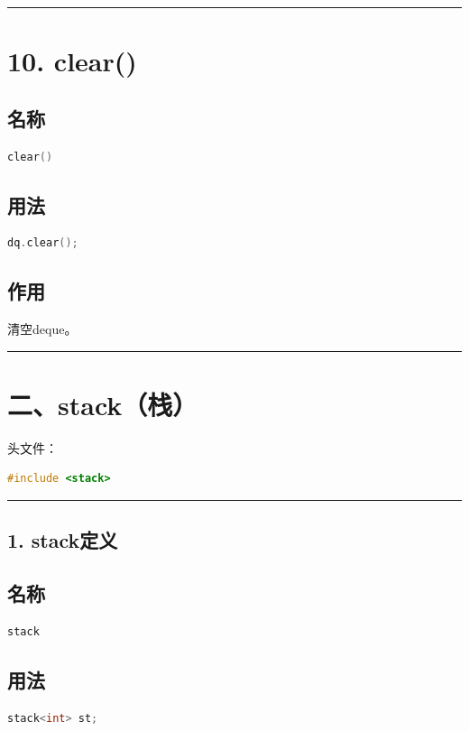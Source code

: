 \documentclass[9pt,twocolumn]{extarticle}
\begin{document}
\noindent\rule{\linewidth}{0.4pt}

\section{10. clear()}

\subsection{名称}
\begin{lstlisting}[language=C++]
clear()
\end{lstlisting}

\subsection{用法}
\begin{lstlisting}[language=C++]
dq.clear();
\end{lstlisting}

\subsection{作用}
清空deque。

\noindent\rule{\linewidth}{0.4pt}

\section{二、stack（栈）}

头文件：
\begin{lstlisting}[language=C++]
#include <stack>
\end{lstlisting}

\noindent\rule{\linewidth}{0.4pt}

\subsection{1. stack定义}

\subsection{名称}
\begin{lstlisting}[language=C++]
stack
\end{lstlisting}

\subsection{用法}
\begin{lstlisting}[language=C++]
stack<int> st;
\end{lstlisting}
\end{document}
